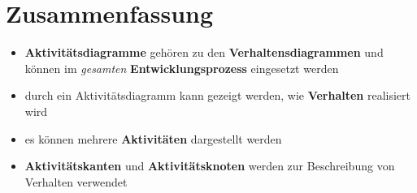 \section{Zusammenfassung}

\begin{itemize}
    \item \textbf{Aktivitätsdiagramme} gehören zu den \textbf{Verhaltensdiagrammen} und können im \textit{gesamten} \textbf{Entwicklungsprozess} eingesetzt werden
    \item durch ein Aktivitätsdiagramm kann gezeigt werden, wie \textbf{Verhalten} realisiert wird
    \item es können mehrere \textbf{Aktivitäten} dargestellt werden
    \item \textbf{Aktivitätskanten} und \textbf{Aktivitätsknoten} werden zur Beschreibung von Verhalten verwendet
\end{itemize}